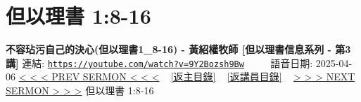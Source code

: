 \documentclass{book}
\begin{document}
\section{但以理書 1:8-16}
\label{sec:9Y2Bozsh9Bw}
\textbf{不容玷污自己的決心(但以理書1\_8-16) - 黃紹權牧師  [但以理書信息系列 - 第3講]}
\newline
\newline
連結: \href{https://youtube.com/watch?v=9Y2Bozsh9Bw}{\texttt{https://youtube.com/watch?v=9Y2Bozsh9Bw}} ~~~~ 語音日期: 2025-04-06
\newline
\newline
\hyperref[sec:nm0yIFofvjE]{< < < PREV SERMON < < <}
~
\hyperlink{toc}{[返主目錄]}
~
\hyperref[ch:preacher18]{[返講員目錄]}
~
\hyperref[sec:499K9je19EI]{> > > NEXT SERMON > > >}
\newline
\newline
但以理書 1:8-16
\newline
\end{document}

